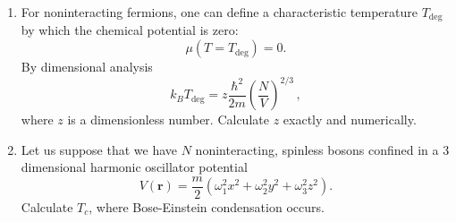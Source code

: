 \documentclass[11pt, a4paper]{article}
\begin{document}
\begin{enumerate}
    \item For noninteracting fermions, one can define a characteristic temperature $T_{\textrm{deg}}$
    by which the chemical potential is zero:
    \begin{equation*}
        \mu(T=T_{\textrm{deg}}) = 0.
    \end{equation*}
    By dimensional analysis
    \begin{equation*}
        k_BT_{\textrm{deg}} = z \frac{\hbar^2}{2m}\left(\frac{N}{V}\right)^{2/3}\,,
    \end{equation*}
    where $z$ is a dimensionless number. Calculate $z$ exactly and numerically.

    \item Let us suppose that we have $N$ noninteracting, spinless bosons confined in a
    3 dimensional harmonic oscillator potential
    \begin{equation*}
        V(\mathbf{r}) = \frac{m}{2}(\omega_1^2x^2 + \omega_2^2y^2 + \omega_3^2z^2).
    \end{equation*}
    Calculate $T_c$, where Bose-Einstein condensation occurs.
\end{enumerate}
\end{document}
